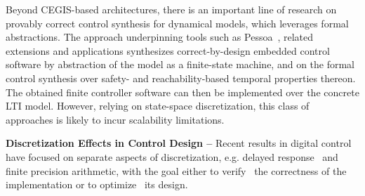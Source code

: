 Beyond CEGIS-based architectures, 
there is an important line of research on provably correct control synthesis for dynamical models, 
which leverages formal abstractions. 
The approach underpinning tools such as Pessoa~\cite{mazo2010pessoa}, related extensions \cite{Anta2010,liu16} and applications \cite{zamani2014} 
synthesizes correct-by-design embedded control software by abstraction of the model as a finite-state machine, 
and on the formal control synthesis over safety- and reachability-based temporal properties thereon.  
The obtained finite controller software can then be implemented over the concrete LTI model. 
However, relying on state-space discretization, this class of approaches is likely to incur scalability limitations.   

\medskip

\textbf{Discretization Effects in Control Design --}
Recent results in digital control have focused on separate aspects of discretization, 
e.g. delayed response~\cite{Duggirala2015} and finite precision arithmetic, 
with the goal either to verify~\cite{daes20161} the correctness of the implementation or to optimize~\cite{oudjida2014design} its design.


